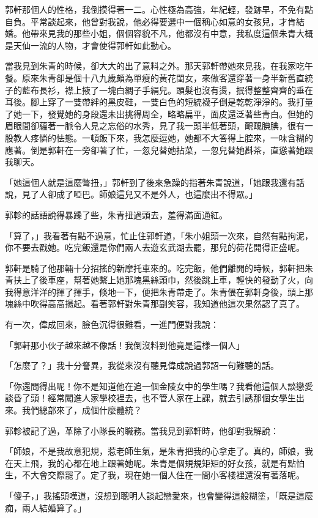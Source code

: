 郭軒那個人的性格，我倒摸得著一二。心性極為高強，年紀輕，發跡早，不免有點自負。平常談起來，他曾對我說，他必得要選中一個稱心如意的女孩兒，才肯結婚。他帶來見我的那些小姐，個個容貌不凡，他都沒有中意，我私度這個朱青大概是天仙一流的人物，才會使得郭軒如此動心。

當我見到朱青的時候，卻大大的出了意料之外。那天郭軒帶她來見我，在我家吃午餐。原來朱青卻是個十八九歲頗為單瘦的黃花閨女，來做客還穿著一身半新舊直統子的藍布長衫，襟上掖了一塊白綢子手絹兒。頭髮也沒有燙，抿得整整齊齊的垂在耳後。腳上穿了一雙帶絆的黑皮鞋，一雙白色的短統襪子倒是乾乾淨淨的。我打量了她一下，發覺她的身段還未出挑得周全，略略扁平，面皮還泛著些青白。但她的眉眼間卻蘊著一脈令人見之忘俗的水秀，見了我一頭半低著頭，靦靦腆腆，很有一股教人疼憐的怯態。一頓飯下來，我怎麼逗她，她都不大答得上腔來，一味含糊的應著。倒是郭軒在一旁卻著了忙，一忽兒替她拈菜，一忽兒替她斟茶，直慫著她跟我聊天。


「她這個人就是這麼彆扭，」郭軒到了後來急躁的指著朱青說道，「她跟我還有話說，見了人卻成了啞巴。師娘這兒又不是外人，也這麼出不得眾。」

郭軫的話語說得暴躁了些，朱青扭過頭去，羞得滿面通紅。

「算了，」我看著有點不過意，忙止住郭軒道，「朱小姐頭一次來，自然有點拘泥，你不要去戳她。吃完飯還是你們兩人去遊玄武湖去罷，那兒的荷花開得正盛呢。

郭軒是騎了他那輛十分招搖的新摩托車來的。吃完飯，他們離開的時候，郭軒把朱青扶上了後車座，幫著她繫上她那塊黑絲頭巾，然後跳上車，輕快的發動了火，向我得意洋洋的揮了揮手，倏地一下，便把朱青帶走了。朱青偎在郭軒身後，頭上那塊絲中吹得高高揚起。看著郭軒對朱青那副笑容，我知道他這次果然認了真了。

有一次，偉成回來，臉色沉得很難看，一進門便對我說：

「郭軒那小伙子越來越不像話！我倒沒料到他竟是這樣一個人」

「怎麼了？」我十分詧異，我從來沒有聽見偉成說過郭詔一句難聽的話。

「你還問得出呢！你不是知道他在追一個金陵女中的學生嗎？我看他這個人談戀愛談昏了頭！經常闖進人家學校裡去，也不管人家在上課，就去引誘那個女學生出來。我們總部來了，成個什麼體統？

郭軫被記了過，革除了小隊長的職務。當我見到郭軒時，他卻對我解說：

「師娘，不是我故意犯規，惹老師生氣，是朱青把我的心拿走了。真的，師娘，我在天上飛，我的心都在地上跟著她呢。朱青是個規規矩矩的好女孩，就是有點怕生，不大會交際罷了。定了我，現在她一個人住在一間小客棧裡還沒有著落呢。

「傻子，」我搖頭嘆道，沒想到聰明人談起戀愛來，也會變得這般糊塗，「既是這麼痴，兩人結婚算了。」

